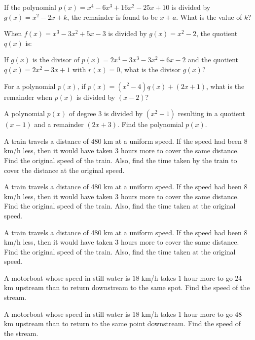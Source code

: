 \documentclass[12pt,a4paper]{exam}
\begin{document}
\begin{questions}
\question[4] If the polynomial $p(x) = x^4 - 6x^3 + 16x^2 - 25x + 10$ is divided by $g(x) = x^2 - 2x + k$, the remainder is found to be $x + a$. What is the value of $k$?
\vspace{0.15cm}

\question[1] When $f(x) = x^3 - 3x^2 + 5x - 3$ is divided by $g(x) = x^2 - 2$, the quotient $q(x)$ is:
\vspace{0.15cm}

\question[1] If $g(x)$ is the divisor of $p(x) = 2x^4 - 3x^3 - 3x^2 + 6x - 2$ and the quotient $q(x) = 2x^2 - 3x + 1$ with $r(x) = 0$, what is the divisor $g(x)$?
\vspace{0.15cm}

\question[1] For a polynomial $p(x)$, if $p(x) = (x^2 - 4)q(x) + (2x + 1)$, what is the remainder when $p(x)$ is divided by $(x - 2)$?
\vspace{0.15cm}

\question[1] A polynomial $p(x)$ of degree $3$ is divided by $(x^2 - 1)$ resulting in a quotient $(x - 1)$ and a remainder $(2x + 3)$. Find the polynomial $p(x)$.
\vspace{0.15cm}

\question[5] A train travels a distance of 480 km at a uniform speed. If the speed had been 8 km/h less, then it would have taken 3 hours more to cover the same distance. Find the original speed of the train. Also, find the time taken by the train to cover the distance at the original speed.
\vspace{0.15cm}

\question[5] A train travels a distance of 480 km at a uniform speed. If the speed had been 8 km/h less, then it would have taken 3 hours more to cover the same distance. Find the original speed of the train. Also, find the time taken at the original speed.
\vspace{0.15cm}

\question[5] A train travels a distance of 480 km at a uniform speed. If the speed had been 8 km/h less, then it would have taken 3 hours more to cover the same distance. Find the original speed of the train. Also, find the time taken at the original speed.
\vspace{0.15cm}

\question[5] A motorboat whose speed in still water is $18$ km/h takes $1$ hour more to go $24$ km upstream than to return downstream to the same spot. Find the speed of the stream.
\vspace{0.15cm}

\question[5] A motorboat whose speed in still water is 18 km/h takes 1 hour more to go 48 km upstream than to return to the same point downstream. Find the speed of the stream.
\vspace{0.15cm}

\end{questions}
\bigskip
\end{document}
